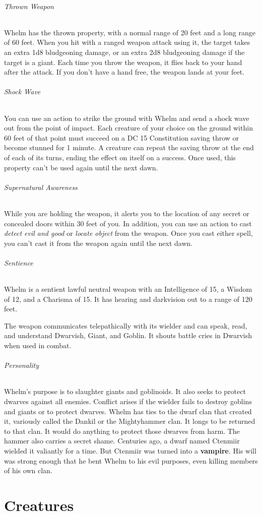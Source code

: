 \documentclass[10pt,a4paper,twoside,bg=print,twocolumn,openany,nodeprecatedcode]{dndbook}
\begin{document}
\subparagraph{Thrown Weapon}
Whelm has the thrown property, with a normal range of 20 feet and a long range of 60 feet. When you hit with a ranged weapon attack using it, the target takes an extra 1d8 bludgeoning damage, or an extra 2d8 bludgeoning damage if the target is a giant. Each time you throw the weapon, it flies back to your hand after the attack. If you don't have a hand free, the weapon lands at your feet.

\subparagraph{Shock Wave}
You can use an action to strike the ground with Whelm and send a shock wave out from the point of impact. Each creature of your choice on the ground within 60 feet of that point must succeed on a DC 15 Constitution saving throw or become stunned for 1 minute. A creature can repeat the saving throw at the end of each of its turns, ending the effect on itself on a success. Once used, this property can't be used again until the next dawn.

\subparagraph{Supernatural Awareness}
While you are holding the weapon, it alerts you to the location of any secret or concealed doors within 30 feet of you. In addition, you can use an action to cast \textit{detect evil and good} or \textit{locate object} from the weapon. Once you cast either spell, you can't cast it from the weapon again until the next dawn.

\subparagraph{Sentience}
Whelm is a sentient lawful neutral weapon with an Intelligence of 15, a Wisdom of 12, and a Charisma of 15. It has hearing and darkvision out to a range of 120 feet.

The weapon communicates telepathically with its wielder and can speak, read, and understand Dwarvish, Giant, and Goblin. It shouts battle cries in Dwarvish when used in combat.

\subparagraph{Personality}
Whelm's purpose is to slaughter giants and goblinoids. It also seeks to protect dwarves against all enemies. Conflict arises if the wielder fails to destroy goblins and giants or to protect dwarves. Whelm has ties to the dwarf clan that created it, variously called the Dankil or the Mightyhammer clan. It longs to be returned to that clan. It would do anything to protect those dwarves from harm. The hammer also carries a secret shame. Centuries ago, a dwarf named Ctenmiir wielded it valiantly for a time. But Ctenmiir was turned into a \textbf{vampire}. His will was strong enough that he bent Whelm to his evil purposes, even killing members of his own clan.

\chapter{Creatures}
\pagestyle{empty}
\end{document}
